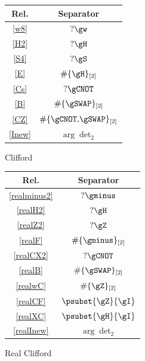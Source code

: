 \begin{figure}[ht]
  \centering
  \begin{subfigure}[t]{0.31\textwidth}
    \centering
    \caption{Clifford}
    \begin{tabular}{|c|c|}
      \hline
      \textbf{Rel.} & \textbf{Separator} \\
      \hline
      \eqref{w8}   & \(?\gw\)   \\
      \eqref{H2}   & \(?\gH\)   \\
      \eqref{S4}   & \(?\gS\)   \\
      \eqref{E}    & \(\#\{\gH\}_{[2]}\) \\
      \eqref{Cs}   & \(?\gCNOT\)\\
      \eqref{B}    & \(\#\{\gSWAP\}_{[2]}\) \\
      \eqref{CZ}   & \(\#\{\gCNOT,\!\gSWAP\}_{[2]}\) \\
      \eqref{Inew} & \(\arg\det_{2}\) \\
      \hline
    \end{tabular}
  \end{subfigure}
  \begin{subfigure}[t]{0.31\textwidth}
    \centering
    \caption{Real Clifford}
    \begin{tabular}{|c|c|}
      \hline
      \textbf{Rel.}      & \textbf{Separator} \\
      \hline
      \eqref{realminus2}     & \(?\gminus\) \\
      \eqref{realH2}         & \(?\gH\) \\
      \eqref{realZ2}         & \(?\gZ\) \\
      \eqref{realF}          & \(\#\{\gminus\}_{[2]}\) \\
      \eqref{realCX2}        & \(?\gCNOT\) \\
      \eqref{realB}          & \(\#\{\gSWAP\}_{[2]}\) \\
      \eqref{realwC}         & \(\#\{\gZ\}_{[2]}\) \\
      \eqref{realCF}         & \(\psubst{\gZ}{\gI}\) \\
      \eqref{realXC}         & \(\psubst{\gH}{\gI}\) \\
      \eqref{realInew}       & \(\arg\det_{2}\) \\
      \hline
    \end{tabular}
  \end{subfigure}
  \begin{subfigure}[t]{0.31\textwidth}

\end{subfigure}
\end{figure}
